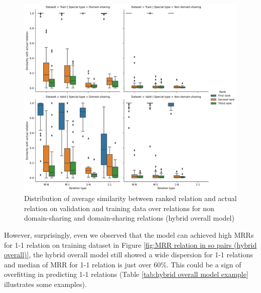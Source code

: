 \begin{figure}[!htbp]
	\begin{center}
	\includegraphics[width=\linewidth]{Images/jaccard_similarity (hybrid overall).png}
	\caption[Distribution of average similarity (hybrid overall)]{Distribution of average similarity between ranked relation and actual relation on validation and training data over relations for non domain-sharing and domain-sharing relations (hybrid overall model)}
	\label{fig:Jaccard similarity (hybrid overall)}
	\end{center}
\end{figure}


However, surprisingly, even we observed that the model can achieved high MRRs for 1-1 relation on training dataset in Figure \ref{fig:MRR relation in so pairs (hybrid overall)}, the hybrid overall model still showed a wide dispersion for 1-1 relations and median of MRR for 1-1 relation is just over 60\%. This could be a sign of overfitting in predicting 1-1 relations (Table \ref{tab:hybrid overall model example} illustrates some examples). 

